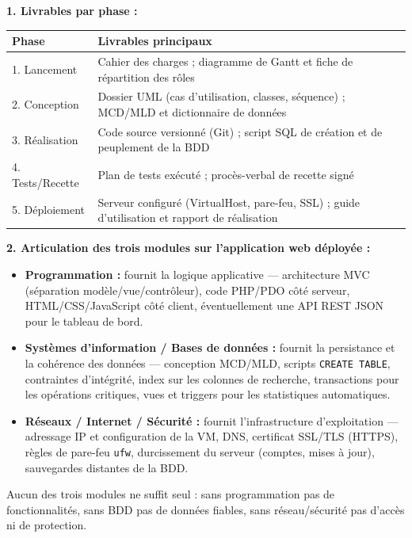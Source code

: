\documentclass[11pt]{article}
\begin{document}
\begin{corrige}
\textbf{1. Livrables par phase :}
\begin{center}
\begin{tabularx}{\linewidth}{|l|X|}\hline
\rowcolor{popblueL} \textbf{Phase} & \textbf{Livrables principaux} \\\hline
1. Lancement & Cahier des charges ; diagramme de Gantt et fiche de répartition des rôles \\\hline
2. Conception & Dossier UML (cas d'utilisation, classes, séquence) ; MCD/MLD et dictionnaire de données \\\hline
3. Réalisation & Code source versionné (Git) ; script SQL de création et de peuplement de la BDD \\\hline
4. Tests/Recette & Plan de tests exécuté ; procès-verbal de recette signé \\\hline
5. Déploiement & Serveur configuré (VirtualHost, pare-feu, SSL) ; guide d'utilisation et rapport de réalisation \\\hline
\end{tabularx}
\end{center}

\textbf{2. Articulation des trois modules sur l'application web déployée :}
\begin{itemize}
    \item \textbf{Programmation :} fournit la logique applicative --- architecture MVC (séparation modèle/vue/contrôleur), code PHP/PDO côté serveur, HTML/CSS/JavaScript côté client, éventuellement une API REST JSON pour le tableau de bord.
    \item \textbf{Systèmes d'information / Bases de données :} fournit la persistance et la cohérence des données --- conception MCD/MLD, scripts \texttt{CREATE TABLE}, contraintes d'intégrité, index sur les colonnes de recherche, transactions pour les opérations critiques, vues et triggers pour les statistiques automatiques.
    \item \textbf{Réseaux / Internet / Sécurité :} fournit l'infrastructure d'exploitation --- adressage IP et configuration de la VM, DNS, certificat SSL/TLS (HTTPS), règles de pare-feu \texttt{ufw}, durcissement du serveur (comptes, mises à jour), sauvegardes distantes de la BDD.
\end{itemize}
Aucun des trois modules ne suffit seul : sans programmation pas de fonctionnalités, sans BDD pas de données fiables, sans réseau/sécurité pas d'accès ni de protection.


\end{corrige}
\end{document}
